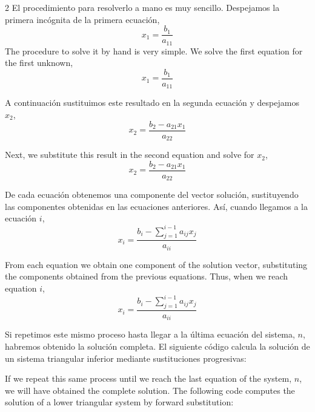 \begin{paracol}{2}
El procedimiento para resolverlo a mano es muy sencillo. Despejamos la primera incógnita de la primera ecuación,
\begin{equation*}
x_1=\frac{b_1}{a_{11}}
\end{equation*}
\switchcolumn
The procedure to solve it by hand is very simple. We solve the first equation for the first unknown,
\begin{equation*}
x_1=\frac{b_1}{a_{11}}
\end{equation*}

\switchcolumn
A continuación sustituimos este resultado en la segunda ecuación y despejamos $x_2$,
\begin{equation*}
x_2=\frac{b_2-a_{21}x_1}{a_{22}}
\end{equation*}

\switchcolumn
Next, we substitute this result in the second equation and solve for $x_2$,
\begin{equation*}
x_2=\frac{b_2-a_{21}x_1}{a_{22}}
\end{equation*}

\switchcolumn

De cada ecuación obtenemos una componente del vector solución, sustituyendo las componentes obtenidas en las ecuaciones anteriores. Así, cuando llegamos a la ecuación $i$,
\begin{equation*}
x_i=\frac{b_i-\sum_{j=1}^{i-1}a_{ij}x_j}{a_{ii}}
\end{equation*}

\switchcolumn
From each equation we obtain one component of the solution vector, substituting the components obtained from the previous equations. Thus, when we reach equation $i$,
\begin{equation*}
x_i=\frac{b_i-\sum_{j=1}^{i-1}a_{ij}x_j}{a_{ii}}
\end{equation*}

\switchcolumn
Si repetimos este mismo proceso hasta llegar a la última ecuación del sistema, $n$, habremos obtenido la solución completa. El siguiente código calcula la solución de un sistema triangular inferior mediante sustituciones progresivas:

\switchcolumn

If we repeat this same process until we reach the last equation of the system, $n$, we will have obtained the complete solution. The following code computes the solution of a lower triangular system by forward substitution:
\end{paracol}

